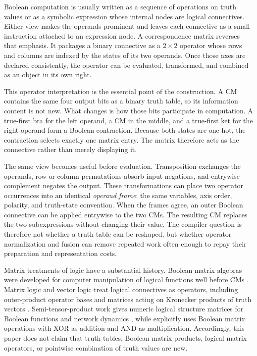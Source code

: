 \documentclass[11pt]{article}
\begin{document}
Boolean computation is usually written as a sequence of operations on truth
values or as a symbolic expression whose internal nodes are logical
connectives. Either view makes the operands prominent and leaves each
connective as a small instruction attached to an expression node. A
correspondence matrix reverses that emphasis. It packages a binary connective
as a $2\times2$ operator whose rows and columns are indexed by the states of
its two operands. Once those axes are declared consistently, the operator can
be evaluated, transformed, and combined as an object in its own right.

This operator interpretation is the essential point of the construction. A
CM contains the same four output bits as a binary truth table, so its
information content is not new. What changes is how those bits participate in
computation. A true-first bra for the left operand, a CM in the middle, and a
true-first ket for the right operand form a Boolean contraction. Because both
states are one-hot, the contraction selects exactly one matrix entry. The
matrix therefore acts as the connective rather than merely displaying it.

The same view becomes useful before evaluation. Transposition exchanges the
operands, row or column permutations absorb input negations, and entrywise
complement negates the output. These transformations can place two operator
occurrences into an identical \emph{operand frame}: the same variables, axis
order, polarity, and truth-state convention. When the frames agree, an outer
Boolean connective can be applied entrywise to the two CMs. The resulting CM
replaces the two subexpressions without changing their value. The compiler
question is therefore not whether a truth table can be reshaped, but whether
operator normalization and fusion can remove repeated work often enough to
repay their preparation and representation costs.

Matrix treatments of logic have a substantial history. Boolean matrix
algebras were developed for computer manipulation of logical functions well
before CMs \citep{edwards1972}. Matrix logic and vector logic treat logical
connectives as operators, including outer-product operator bases and matrices
acting on Kronecker products of truth vectors \citep{stern1988,mizraji1992,
mizraji2008}. Semi-tensor-product work gives numeric logical structure
matrices for Boolean functions and network dynamics
\citep{chengqi2010,zhaogaocheng}, while \citet{chengzhaoxu2011} explicitly
uses Boolean matrix operations with XOR as addition and AND as multiplication.
Accordingly, this paper does not claim that truth tables, Boolean matrix
products, logical matrix operators, or pointwise combination of truth values
are new.
\end{document}
